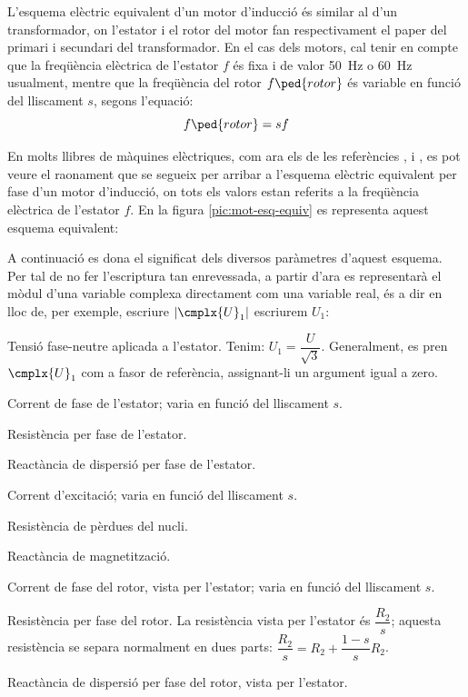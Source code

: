 L'esquema elèctric equivalent d'un motor d'inducció és similar al d'un transformador, on l'estator i el rotor del motor fan respectivament el paper del primari i  secundari del transformador. En el cas dels motors, cal tenir en compte que la freqüència elèctrica de l'estator $f$ és fixa i de valor \qty{50}{Hz} o \qty{60}{Hz} usualment, mentre que la freqüència del rotor $f\ped{rotor}$ és variable en funció del lliscament $s$, segons l'equació:
\begin{equation}
    f\ped{rotor} = s f
\end{equation}

En molts llibres de màquines elèctriques, com ara els de les referències \cite{CHA}, \cite{FIT} i \cite{JFM}, es pot veure el raonament que se segueix per arribar a l'esquema elèctric equivalent per fase d'un motor d'inducció, on tots els valors estan referits a la freqüència elèctrica de l'estator $f$. En la figura \vref{pic:mot-esq-equiv} es representa aquest esquema equivalent:

\begin{center}
    
    \label{pic:mot-esq-equiv}
\end{center}

A continuació es dona el significat dels diversos paràmetres d'aquest esquema. Per tal de no fer l'escriptura tan enrevessada, a partir d'ara es representarà el mòdul d'una variable complexa  directament com una variable real, és a dir en lloc de, per exemple, escriure $|\cmplx{U}_1|$ escriurem $U_1$:

\begin{list}{}
   {\setlength{\labelwidth}{10mm} \setlength{\leftmargin}{15mm} \setlength{\labelsep}{5mm}}
   \item[$\cmplx{U}_1$] Tensió fase-neutre aplicada a l'estator. Tenim: $U_1 = \dfrac{U}{\sqrt{3}}$. Generalment,   es pren $\cmplx{U}_1$ com a fasor de referència, assignant-li un argument igual a zero.
   \item[$\cmplx{I}_1(s)$] Corrent de fase de l'estator; varia en funció del lliscament $s$.
   \item[$R_1$] Resistència per fase de l'estator.
   \item[$X_1$] Reactància de dispersió per fase de l'estator.
   \item[$\cmplx{I}_0(s)$] Corrent d'excitació; varia en funció del lliscament $s$.
   \item[$R\ped{Fe}$] Resistència de pèrdues del nucli.
   \item[$X\ped{m}$] Reactància de magnetització.
   \item[$\cmplx{I}_2(s)$] Corrent de fase del rotor, vista per l'estator; varia en funció del lliscament $s$.
   \item[$R_2$] Resistència per fase del rotor. La resistència vista per l'estator és $\dfrac{R_2}{s}$; aquesta resistència  se separa normalment en dues parts: $\dfrac{R_2}{s} = R_2 + \dfrac{1-s}{s} R_2$.
   \item[$X_2$] Reactància de dispersió per fase del rotor, vista per l'estator.
\end{list}

